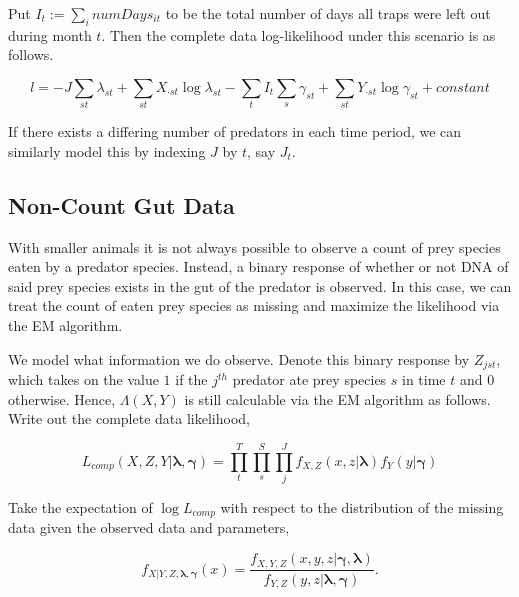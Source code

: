 \documentclass[12pt]{article}\usepackage[]{graphicx}\usepackage[]{color}
\begin{document}
Put $I_t := \sum_{i} numDays_{it}$ to be the total number of days all traps were left out during month $t$.  Then the complete data log-likelihood under this scenario is as follows.

\begin{equation*}
  l = -J\sum_{st}\lambda_{st} + \sum_{st}X_{\cdot st} \log{\lambda_{st}} - \sum_{t} I_t \sum_{s} \gamma_{st} + \sum_{st}Y_{\cdot st}\log{\gamma_{st}} + constant
\end{equation*}

If there exists a differing number of predators in each time period, we can similarly model this by indexing $J$ by $t$, say $J_t$.

\subsection{Non-Count Gut Data}

With smaller animals it is not always possible to observe a count of prey species eaten by a predator species.  Instead, a binary response of whether or not DNA of said prey species exists in the gut of the predator is observed.  In this case, we can treat the count of eaten prey species as missing and maximize the likelihood via the EM algorithm.  

We model what information we do observe.  Denote this binary response by $Z_{jst}$, which takes on the value $1$ if the $j^{th}$ predator ate prey species $s$ in time $t$ and $0$ otherwise.  Hence, $\Lambda(X,Y)$ is still calculable via the EM algorithm as follows.  Write out the complete data likelihood,

\begin{equation}
  \label{eq:llComp}
  L_{comp}(X,Z,Y|\boldsymbol{\lambda}, \boldsymbol{\gamma}) = \prod_{t}^T \prod_{s}^S \prod_{j}^J f_{X,Z}(x,z|\boldsymbol{\lambda})  f_{Y}(y|\boldsymbol{\gamma})
\end{equation}

\noindent Take the expectation of $\log{L_{comp}}$ with respect to the distribution of the missing data given the observed data and parameters, 


\begin{equation*}
  f_{X|Y,Z,\boldsymbol{\lambda},\boldsymbol{\gamma}}(x) = \frac{f_{X,Y,Z}(x,y,z|\boldsymbol{\gamma},\boldsymbol{\lambda})}{f_{Y,Z}(y,z|\boldsymbol{\lambda},\boldsymbol{\gamma})}. %
\end{equation*}
\end{document}
